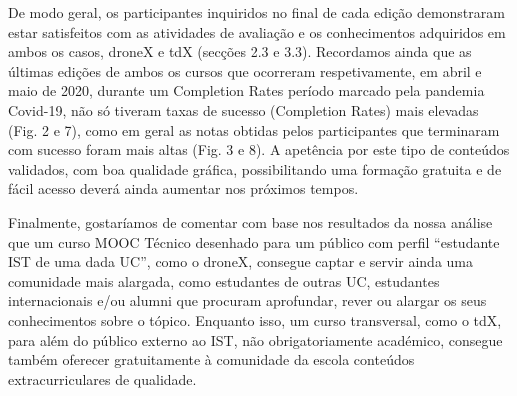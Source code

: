 De modo geral, os participantes inquiridos no final de cada edição demonstraram estar satisfeitos com as atividades de avaliação e os conhecimentos adquiridos em ambos os casos, droneX e tdX (secções 2.3 e 3.3). Recordamos ainda que as últimas edições de ambos os cursos que ocorreram respetivamente, em abril e maio de 2020, durante um
Completion Rates período marcado pela pandemia Covid-19, não só tiveram taxas de sucesso (Completion Rates) mais elevadas (Fig. 2 e
7), como em geral as notas obtidas pelos participantes que terminaram com sucesso foram mais altas (Fig. 3 e 8). A apetência por este tipo de conteúdos validados, com boa qualidade gráfica, possibilitando uma formação gratuita e de fácil acesso deverá ainda aumentar nos próximos tempos.

Finalmente, gostaríamos de comentar com base nos resultados da nossa análise que um curso MOOC Técnico desenhado para um público com perfil “estudante IST de uma dada UC”, como o droneX, consegue captar e servir ainda uma comunidade mais alargada, como estudantes de outras UC, estudantes internacionais e/ou alumni que procuram aprofundar, rever ou alargar os seus conhecimentos sobre o tópico. Enquanto isso, um curso transversal,
como o tdX, para além do público externo ao IST, não obrigatoriamente académico, consegue também oferecer gratuitamente à comunidade da escola conteúdos extracurriculares de qualidade.






